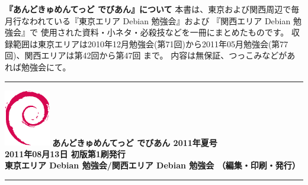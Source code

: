 \documentclass[mingoth,a4paper]{jsarticle}
\begin{document}
\printindex

\newpage
\thispagestyle{empty}\mbox{}%
\newpage
\cleartoevenpage

\thispagestyle{empty}
{
\large
\begin{itembox}{\bf 『あんどきゅめんてっど でびあん』について}
本書は、東京および関西周辺で毎月行なわれている『東京エリア Debian 勉強会』および
『関西エリア Debian 勉強会』で
使用された資料・小ネタ・必殺技などを一冊にまとめたものです。
収録範囲は東京エリアは2010年12月勉強会(第71回)から2011年05月勉強会(第77回)、関西エリアは第42回から第47回 まで。
内容は無保証、つっこみなどがあれば勉強会にて。
\end{itembox}
}

\vspace*{15cm}
{\color{dancerlightblue}\rule{\hsize}{1mm}}
\vspace{2mm}
\includegraphics[width=2cm]{image200502/openlogo-nd.eps}
\noindent \Large \bf あんどきゅめんてっど でびあん 2011年夏号\\
\noindent \normalfont 2011年08月13日 \hspace{5mm}  初版第1刷発行\\
\noindent \normalfont 東京エリア Debian 勉強会/関西エリア Debian 勉強会 （編集・印刷・発行）\\
{\color{dancerdarkblue}\rule{\hsize}{1mm}}
\end{document}
